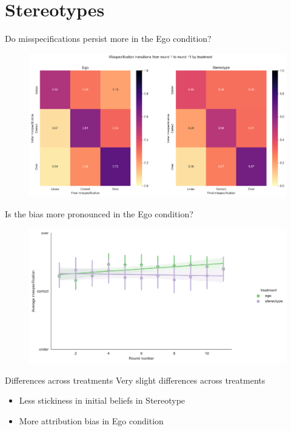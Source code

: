 \documentclass[aspectratio=169]{beamer}
\begin{document}
\section*{Stereotypes}

\begin{frame}{Do misspecifications persist more in the Ego condition?}

        \begin{figure}
            \centering
            \includegraphics[scale=.3]{misspecification_transitions_treatment.png}
        \end{figure}
\end{frame}

\begin{frame}{Is the bias more pronounced in the Ego condition?}

    \begin{figure}
        \centering
        \includegraphics[scale=.5]{misspecification_round.png}
    \end{figure}
\end{frame}

\begin{frame}{Differences across treatments}
    Very slight differences across treatments\\
    \begin{itemize}
        \item Less stickiness in initial beliefs in Stereotype
        \item More attribution bias in Ego condition
    \end{itemize}


\end{frame}
\end{document}
